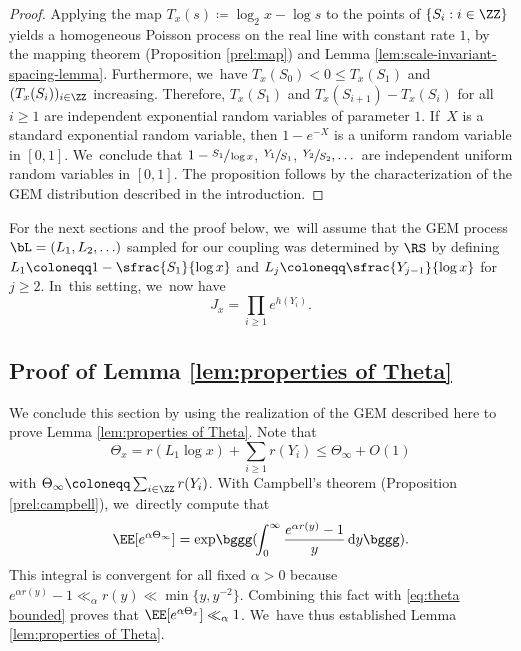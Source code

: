 \begin{proof}
Applying the map $T_x(s) \coloneqq \log_2 x - \log s$ to the points of \hbox{$\{S_i : i \in \ZZ\}$} yields a homogeneous Poisson process on the real line with constant rate $1$, by the mapping theorem (Proposition \ref{prel:map}) and Lemma \ref{lem:scale-invariant-spacing-lemma}. Furthermore, we~have \hbox{$T_x(S_0) \!<\! 0 \!\le\! T_x(S_1)$} and $(T_x(S_i))_{i \in \ZZ}$ increasing. Therefore, $T_x(S_1)$ and \hbox{$T_x(S_{i+1}) \!-\! T_x(S_i)$} for all $i \ge 1$ are independent exponential random variables of parameter $1$. If~$X$ is a standard exponential random variable, then $1-e^{-X}$ is a uniform random variable in $[0, 1]$. We~conclude that $1-\sfrac{S_1}{\log x}$, $\sfrac{Y_1}{S_1}$, $\sfrac{Y_2}{S_2},\dots$ are independent uniform random variables in $[0, 1]$. The proposition follows by the characterization of the GEM distribution described in the introduction.
\end{proof}

For the next sections and the proof below, we~will assume that the GEM process $\bL = (L_1, L_2, \ldots)$ sampled for our coupling was determined by $\RS$ by defining \hbox{$L_1 \coloneqq 1-\sfrac{S_1}{\log x}$} and $L_j \coloneqq \sfrac{Y_{j-1}}{\log x}$ for $j \ge 2$. In~this setting, we~now have
\begin{equation}
\label{eq:J_x alternative definition}
J_x = \prod_{i \ge 1} e^{h(Y_i)}.
\end{equation}

\subsection{Proof of Lemma \ref{lem:properties of Theta}}
We conclude this section by using the realization of the GEM described here to prove Lemma \ref{lem:properties of Theta}. Note that
\begin{equation}
\label{eq:theta bounded}
\Theta_x = r(L_1\log x) + \sum_{i \ge 1} r(Y_i) \le \Theta_\infty + O(1)
\end{equation}
with $\Theta_\infty \coloneqq \sum_{i \in \ZZ} r(Y_i)$. With Campbell's theorem (Proposition \ref{prel:campbell}), we~directly compute that
\begin{equation}
\label{eq:mgf theta infty}
\EE[e^{\alpha \Theta_\infty}] = \exp\!\bggg(\!\int_{0}^\infty \frac{e^{\alpha r(y)} - 1}{y}\, \mathrm dy\bggg).
\end{equation}
This integral is convergent for all fixed $\alpha \!>\! 0$ because $e^{\alpha r(y)} -1 \!\ll_\alpha\! r(y) \!\ll\!\min\{y,y^{-2}\}$. Combining this fact with \eqref{eq:theta bounded} proves that $\EE[e^{\alpha \Theta_x}] \ll_\alpha 1$. We~have thus established Lemma \ref{lem:properties of Theta}.

